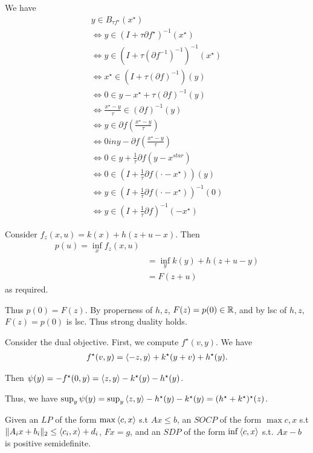 \begin{exercises}
\item
  We have
  \begin{align}
    \label{eq:43}
    y \in B_{\tau f^{\star}}(x^{\star}) \\
    \iff y \in (I + \tau \partial f^{\star})^{-1}(x^{\star}) \\
    \iff y \in (I + \tau (\partial f^{-1})^{-1})^{-1}(x^{\star}) \\
    \iff x^{\star} \in (I + \tau (\partial f)^{-1})(y) \\
    \iff 0 \in y - x^{\star} + \tau (\partial f)^{-1}(y) \\
    \iff \frac{x^{\star} - y}{\tau} \in (\partial f)^{-1}(y) \\
    \iff y \in \partial f (\frac{x^{\star} -y}{\tau}) \\
    \iff 0 in y - \partial f(\frac{x^{\star}-y}{\tau}) \\
    \iff 0 \in y + \frac{1}{\tau} \partial f(y - x^{star}) \\
    \iff 0 \in (I + \frac{1}{\tau} \partial f(\cdot - x^{\star}))(y) \\
    \iff y \in (I + \frac{1}{\tau} \partial f(\cdot - x^{\star}))^{-1}(0) \\
    \iff y \in (I + \frac{1}{\tau} \partial f)^{-1}(-x^{\star})
  \end{align}
\item
  Consider $f_{z}(x, u) = k(x) + h(z + u -x)$.  Then
  \begin{align}
    \label{eq:44}
    p(u) = \inf_{x} f_{z}(x, u) \\
    &= \inf_{y} k(y) + h(z + u - y) \\
    &= F(z + u)
  \end{align} as required.

  Thus $p(0) = F(z)$. By properness of $h, z$, $F(z) = p(0) \in \mathbb{R}$,
  and by lsc of $h, z$, $F(z) = p(0)$ is lsc.  Thus strong duality
  holds.

  Consider the dual objective.  First, we compute $f^{\star}(v, y)$.
  We have
  \begin{align}
    \label{eq:45}
    f^{\star}(v, y) = \IP{-z, y} + k^{\star}(y + v) + h^{\star}(y).  
  \end{align}

  Then $\psi(y) = - f^{\star}(0, y) = \IP{z, y} - k^{\star}(y) -
  h^{\star}(y)$.

  Thus, we have $\sup_{y} \psi(y) = \sup_{y} \IP{z, y} - h^{\star}(y)
  - k^{\star}(y) = (h^{\star} + k^{\star})^{\star}(z)$.
\item
  Given an $LP$ of the form $\max \IP{c, x}$ s.t $Ax \leq b$, an
  $SOCP$ of the form $\max {c, x}$ s.t $\| A_{i} x + b_{i}\|_{2} \leq
  \IP{c_{i}, x} + d_{i}$, $Fx = g$, and an $SDP$ of the form $\inf
  \IP{c, x}$ s.t. $Ax - b$ is positive semidefinite.


\end{exercises}
